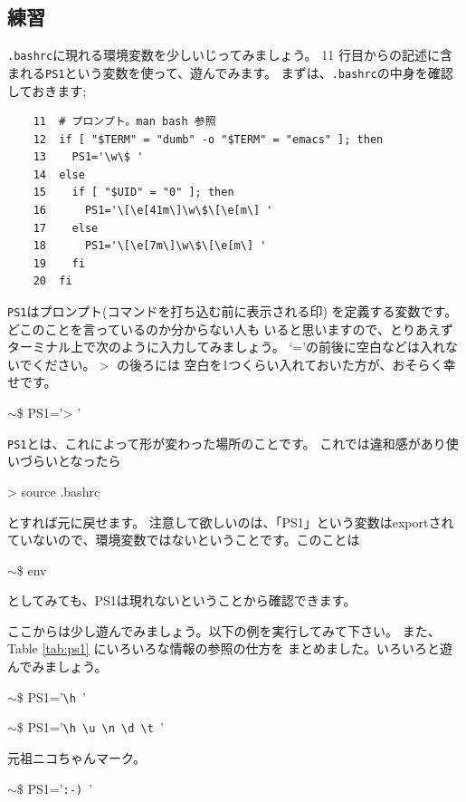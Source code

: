 \documentclass[a4j]{ltjreport}
\begin{document}
    \subsection{練習}
    \verb+.bashrc+に現れる環境変数を少しいじってみましょう。
    11 行目からの記述に含まれる\verb+PS1+という変数を使って、遊んでみます。
    まずは、\verb+.bashrc+の中身を確認しておきます;
    \begin{verbatim}
    11  # プロンプト。man bash 参照
    12  if [ "$TERM" = "dumb" -o "$TERM" = "emacs" ]; then
    13    PS1='\w\$ '
    14  else
    15    if [ "$UID" = "0" ]; then
    16      PS1='\[\e[41m\]\w\$\[\e[m\] '
    17    else
    18      PS1='\[\e[7m\]\w\$\[\e[m\] '
    19    fi
    20  fi
    \end{verbatim}
    \verb+PS1+はプロンプト(コマンドを打ち込む前に表示される印)
    を定義する変数です。どこのことを言っているのか分からない人も
    いると思いますので、とりあえずターミナル上で次のように入力してみましょう。
    `='の前後に空白などは入れないでください。$>$ の後ろには
    空白を1つくらい入れておいた方が、おそらく幸せです。
    \begin{screen}
        $\sim$\$ PS1='> '
    \end{screen}
    \verb+PS1+とは、これによって形が変わった場所のことです。
    これでは違和感があり使いづらいとなったら
    \begin{screen}
        > source .bashrc
    \end{screen}
    とすれば元に戻せます。
    注意して欲しいのは、「PS1」という変数はexportされていないので、環境変数ではないということです。このことは
    \begin{screen}
        $\sim$\$ env
    \end{screen}
    としてみても、PS1は現れないということから確認できます。

    ここからは少し遊んでみましょう。以下の例を実行してみて下さい。
    また、Table \ref{tab:ps1} にいろいろな情報の参照の仕方を
    まとめました。いろいろと遊んでみましょう。
    \begin{screen}
        $\sim$\$ PS1='\verb+\h +' 
    \end{screen}

    \begin{screen}
        $\sim$\$ PS1='\verb+\h \u \n \d \t +'
    \end{screen}

    元祖ニコちゃんマーク。
    \begin{screen}
        $\sim$\$ PS1='\verb+:-) +'
    \end{screen}
\end{document}
